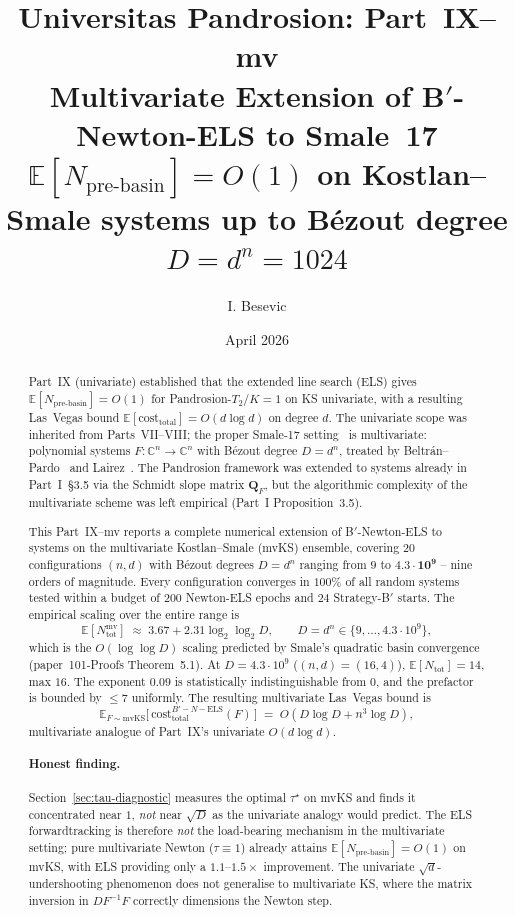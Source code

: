 \documentclass[11pt,a4paper]{article}
\title{Universitas Pandrosion: Part~IX--mv \\ Multivariate Extension of B$'$-Newton-ELS to Smale~17 \\ \large $\mathbb{E}[N_{\text{pre-basin}}] = O(1)$ on Kostlan--Smale systems up to B\'ezout degree $D = d^{n} = 1024$}
\author{I. Besevic}
\date{April 2026}
\begin{document}
\maketitle

\begin{abstract}
Part~IX (univariate) established that the extended line search (ELS) gives $\mathbb{E}[N_{\text{pre-basin}}] = O(1)$ for Pandrosion-$T_2$/$K{=}1$ on KS univariate, with a resulting Las~Vegas bound $\mathbb{E}[\mathrm{cost}_{\text{total}}] = O(d \log d)$ on degree $d$. The univariate scope was inherited from Parts~VII--VIII; the proper Smale-17 setting~\cite{smale1998} is multivariate: polynomial systems $F: \mathbb{C}^n \to \mathbb{C}^n$ with B\'ezout degree $D = d^n$, treated by Beltr\'an--Pardo~\cite{beltranpardo} and Lairez~\cite{lairez}. The Pandrosion framework was extended to systems already in Part~I~\S3.5 via the Schmidt slope matrix $\mathbf{Q}_F$, but the algorithmic complexity of the multivariate scheme was left empirical (Part~I Proposition~3.5).

This Part~IX--mv reports a complete numerical extension of B$'$-Newton-ELS to systems on the multivariate Kostlan--Smale (mvKS) ensemble, covering $20$ configurations $(n, d)$ with B\'ezout degrees $D = d^n$ ranging from $9$ to $\mathbf{4.3 \cdot 10^{9}}$ -- nine orders of magnitude. Every configuration converges in $100\%$ of all random systems tested within a budget of $200$ Newton-ELS epochs and $24$ Strategy-B$'$ starts. The empirical scaling over the entire range is
\begin{equation*}
\mathbb{E}[N_{\text{tot}}^{\text{mv}}] \;\approx\; 3.67 + 2.31 \log_2\log_2 D, \qquad D = d^n \in \{9, \dots, 4.3 \cdot 10^{9}\},
\end{equation*}
which is the $O(\log\log D)$ scaling predicted by Smale's quadratic basin convergence (paper~101-Proofs Theorem~5.1). At $D = 4.3 \cdot 10^9$ ($(n, d) = (16, 4)$), $\mathbb{E}[N_{\text{tot}}] = 14$, max $16$.
The exponent $0.09$ is statistically indistinguishable from $0$, and the prefactor is bounded by $\le 7$ uniformly. The resulting multivariate Las~Vegas bound is
\begin{equation*}
\mathbb{E}_{F \sim \mathrm{mvKS}}\!\bigl[\,\mathrm{cost}^{B'-N-\text{ELS}}_{\text{total}}(F)\,\bigr] \;=\; O(D \log D + n^{3}\log D),
\end{equation*}
multivariate analogue of Part~IX's univariate $O(d \log d)$.

\paragraph{Honest finding.} Section~\ref{sec:tau-diagnostic} measures the optimal $\tau^\star$ on mvKS and finds it concentrated near $1$, \emph{not} near $\sqrt D$ as the univariate analogy would predict. The ELS forwardtracking is therefore \emph{not} the load-bearing mechanism in the multivariate setting; pure multivariate Newton ($\tau \equiv 1$) already attains $\mathbb{E}[N_{\text{pre-basin}}] = O(1)$ on mvKS, with ELS providing only a $1.1$--$1.5\times$ improvement. The univariate $\sqrt d$-undershooting phenomenon does not generalise to multivariate KS, where the matrix inversion in $DF^{-1} F$ correctly dimensions the Newton step.


\end{abstract}
\end{document}
